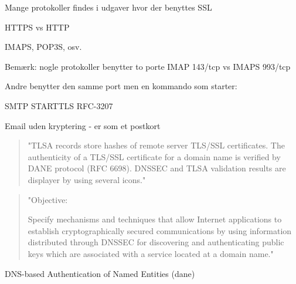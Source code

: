 \documentclass[Screen16to9,17pt]{foils}
\begin{document}

\begin{list1}
\item Mange protokoller findes i udgaver hvor der benyttes SSL
\item HTTPS vs HTTP
\item IMAPS, POP3S, osv.
\item Bemærk: nogle protokoller benytter to porte IMAP 143/tcp vs IMAPS 993/tcp
\item Andre benytter den samme port men en kommando som starter:
\item SMTP STARTTLS RFC-3207
\end{list1}




\centerline{Email uden kryptering - er som et postkort}






\begin{quote}
"TLSA records store hashes of remote server TLS/SSL certificates. The authenticity of a TLS/SSL certificate for a domain name is verified by DANE protocol (RFC 6698). DNSSEC and TLSA validation results are displayer by using several icons."
\end{quote}



\begin{quote}
"Objective:

Specify mechanisms and techniques that allow Internet applications to
establish cryptographically secured communications by using information
distributed through DNSSEC for discovering and authenticating public
keys which are associated with a service located at a domain name."
\end{quote}

\begin{list1}
\item DNS-based Authentication of Named Entities (dane)
\end{list1}

\end{document}
